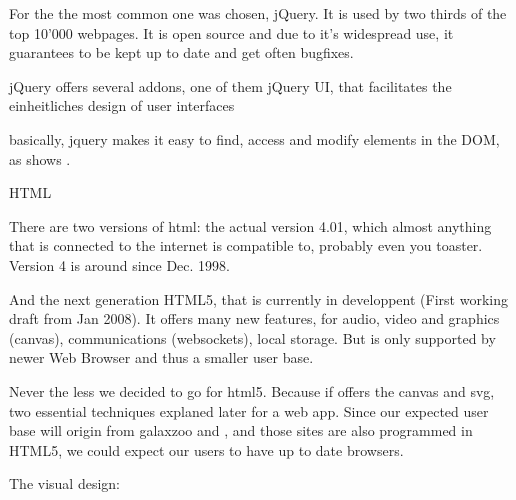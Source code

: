 For \spl the the most common one was chosen, jQuery.
It is used by two thirds of the top 10'000 webpages.
It is open source and due to it's widespread use, it guarantees to be kept up to date and get often bugfixes.

jQuery offers several addons, one of them jQuery UI, that facilitates the einheitliches design of user interfaces

basically, jquery makes it easy to find, access and modify elements in the DOM, as shows .





HTML

There are two versions of html: the actual version 4.01, which almost anything that is connected to the internet is compatible to, probably even you toaster. Version 4 is around since Dec. 1998.

And the next generation HTML5, that is currently in developpent (First working draft from Jan 2008).
It offers many new features, for audio, video and graphics (canvas), communications (websockets), local storage.
But is only supported by newer Web Browser and thus a smaller user base.

Never the less we decided to go for html5. Because if offers the canvas and svg, two essential techniques explaned later for a web app.
Since our expected user base will origin from galaxzoo and \sw, and those sites are also programmed in HTML5, we could expect our users to have up to date browsers.





The visual design:



